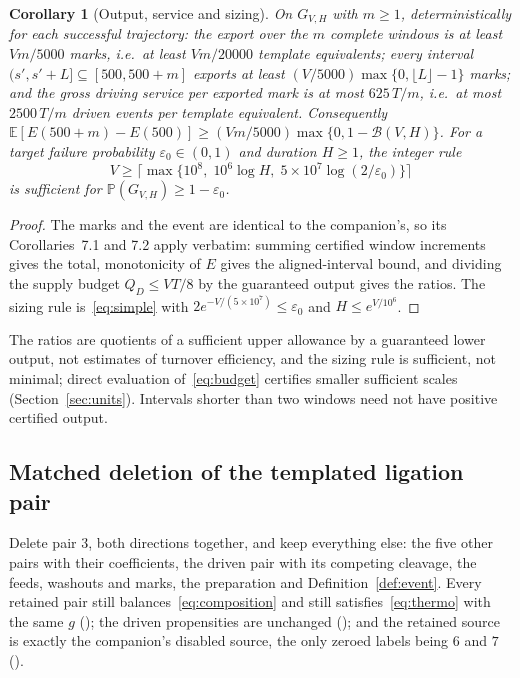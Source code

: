 \documentclass[11pt,a4paper]{article}
\theoremstyle{plain}
\newtheorem{corollary}[theorem]{Corollary}
\theoremstyle{definition}
\theoremstyle{remark}
\newcommand{\E}{\mathbb E}
\newcommand{\Prob}{\mathbb P}
\newcommand{\eps}{\varepsilon}
\newcommand{\Good}{G_{V,H}}
\newcommand{\Bud}{\mathcal B}
\begin{document}
\begin{corollary}[Output, service and sizing]\label{cor:consequences}
On $\Good$ with $m\ge1$, deterministically for each successful trajectory: the export over the $m$ complete windows is at least $Vm/5000$ marks, i.e.\ at least $Vm/20000$ template equivalents; every interval $(s',s'+L]\subseteq[500,500+m]$ exports at least $(V/5000)\max\{0,\lfloor L\rfloor-1\}$ marks; and the gross driving service per exported mark is at most $625\,T/m$, i.e.\ at most $2500\,T/m$ driven events per template equivalent. Consequently $\E[E(500+m)-E(500)]\ge(Vm/5000)\max\{0,1-\Bud(V,H)\}$. For a target failure probability $\eps_0\in(0,1)$ and duration $H\ge1$, the integer rule
\begin{equation}\label{eq:sizing}
 V\ge\Big\lceil\max\big\{10^8,\;10^6\log H,\;5\times10^7\log(2/\eps_0)\big\}\Big\rceil
\end{equation}
is sufficient for $\Prob(\Good)\ge1-\eps_0$.
\end{corollary}
\begin{proof}
The marks and the event are identical to the companion's, so its Corollaries~7.1 and 7.2 apply verbatim: summing certified window increments gives the total, monotonicity of $E$ gives the aligned-interval bound, and dividing the supply budget $Q_D\le VT/8$ by the guaranteed output gives the ratios. The sizing rule is~\eqref{eq:simple} with $2e^{-V/(5\times10^7)}\le\eps_0$ and $H\le e^{V/10^6}$.
\end{proof}
The ratios are quotients of a sufficient upper allowance by a guaranteed lower output, not estimates of turnover efficiency, and the sizing rule is sufficient, not minimal; direct evaluation of~\eqref{eq:budget} certifies smaller sufficient scales (Section~\ref{sec:units}). Intervals shorter than two windows need not have positive certified output.

\subsection{Matched deletion of the templated ligation pair}\label{sec:disabled}
Delete pair 3, both directions together, and keep everything else: the five other pairs with their coefficients, the driven pair with its competing cleavage, the feeds, washouts and marks, the preparation and Definition~\ref{def:event}. Every retained pair still balances~\eqref{eq:composition} and still satisfies~\eqref{eq:thermo} with the same $g$ (); the driven propensities are unchanged (); and the retained source is exactly the companion's disabled source, the only zeroed labels being $6$ and $7$ ().
\end{document}
